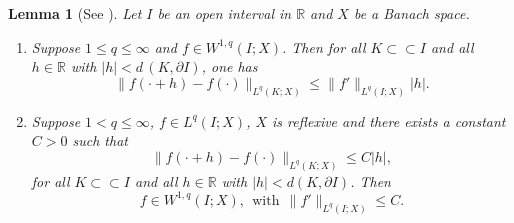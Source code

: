 \documentclass[preprint,compress,12pt]{elsarticle}
\newtheorem{lemma}[theorem]{Lemma}
\numberwithin{equation}{section}
\begin{document}
\begin{lemma}[See \cite{outage}]\label{relay}
	Let $I$ be an open interval in $\mathbb{R}$ and $X$ be a Banach space.
	\begin{enumerate}[label=(\roman*)]
		\item  Suppose $1\leq q\leq\infty$ and  $f\in W^{1,q}(I;X)$.  Then for all $K\subset\subset I$ and all $h\in\mathbb{R}$ with $|h|< d \,(K,\partial I)$, one has
		\begin{equation}
			\|f(\cdot+h)-f(\cdot)\|_{L^{q}(K;X)}\leq  \|f'\|_{L^{q}(I;X)}|h|.
		\end{equation}
		\item Suppose $1< q\leq\infty$, $f\in L^{q}(I;X)$, $X$ is reflexive and there exists a constant $C>0$ such that
		\begin{equation}
			\|f(\cdot+h)-f(\cdot)\|_{L^{q}(K;X)}\leq C |h|,
		\end{equation}
		for all $K\subset\subset I$ and all $h\in\mathbb{R}$ with $|h|<d(K,\partial I)$. Then
		\begin{equation}
			f\in  W^{1,q}(I;X),\ \ \text{with} \ \ \|f'\|_{L^{q}(I;X)}\leq C.
		\end{equation}
	\end{enumerate}	
\end{lemma}	
\end{document}
